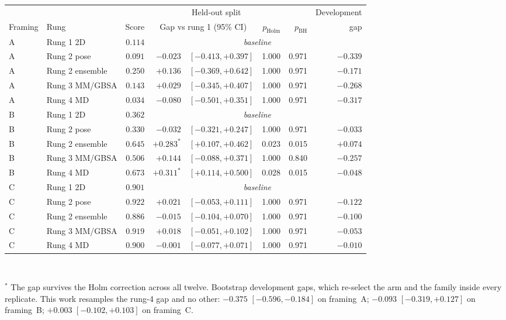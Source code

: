 \begin{tabular}{llrr@{\,}lrrr}
\hline
& & \multicolumn{5}{c}{Held-out split} & Development \\
\cline{3-7}\cline{8-8}
Framing & Rung & Score & \multicolumn{2}{c}{Gap vs rung 1 (95\% CI)} & $p_{\text{Holm}}$ & $p_{\text{BH}}$ & gap \\
\hline
A & Rung 1 2D & $0.114$ & \multicolumn{5}{c}{\emph{baseline}} \\
A & Rung 2 pose & $0.091$ & $-0.023$ & $[-0.413, +0.397]$ & 1.000 & 0.971 & $-0.339$ \\
A & Rung 2 ensemble & $0.250$ & $+0.136$ & $[-0.369, +0.642]$ & 1.000 & 0.971 & $-0.171$ \\
A & Rung 3 MM/GBSA & $0.143$ & $+0.029$ & $[-0.345, +0.407]$ & 1.000 & 0.971 & $-0.268$ \\
A & Rung 4 MD & $0.034$ & $-0.080$ & $[-0.501, +0.351]$ & 1.000 & 0.971 & $-0.317$ \\
B & Rung 1 2D & $0.362$ & \multicolumn{5}{c}{\emph{baseline}} \\
B & Rung 2 pose & $0.330$ & $-0.032$ & $[-0.321, +0.247]$ & 1.000 & 0.971 & $-0.033$ \\
B & Rung 2 ensemble & $0.645$ & $+0.283^{*}$ & $[+0.107, +0.462]$ & 0.023 & 0.015 & $+0.074$ \\
B & Rung 3 MM/GBSA & $0.506$ & $+0.144$ & $[-0.088, +0.371]$ & 1.000 & 0.840 & $-0.257$ \\
B & Rung 4 MD & $0.673$ & $+0.311^{*}$ & $[+0.114, +0.500]$ & 0.028 & 0.015 & $-0.048$ \\
C & Rung 1 2D & $0.901$ & \multicolumn{5}{c}{\emph{baseline}} \\
C & Rung 2 pose & $0.922$ & $+0.021$ & $[-0.053, +0.111]$ & 1.000 & 0.971 & $-0.122$ \\
C & Rung 2 ensemble & $0.886$ & $-0.015$ & $[-0.104, +0.070]$ & 1.000 & 0.971 & $-0.100$ \\
C & Rung 3 MM/GBSA & $0.919$ & $+0.018$ & $[-0.051, +0.102]$ & 1.000 & 0.971 & $-0.053$ \\
C & Rung 4 MD & $0.900$ & $-0.001$ & $[-0.077, +0.071]$ & 1.000 & 0.971 & $-0.010$ \\
\hline
\end{tabular}
\\[0.5em]
\begin{minipage}{0.95\textwidth}\footnotesize $^{*}$ The gap survives the Holm correction across all twelve. Bootstrap development gaps, which re-select the arm and the family inside every replicate. This work resamples the rung-4 gap and no other: $-0.375$ $[-0.596, -0.184]$ on framing~A; $-0.093$ $[-0.319, +0.127]$ on framing~B; $+0.003$ $[-0.102, +0.103]$ on framing~C.\end{minipage}
